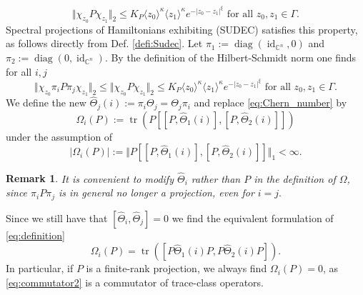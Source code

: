 \documentclass[reqno,12pt,letterpaper]{amsart}
\newcommand{\CC}{{\mathbb C}}
\newtheorem{rem}[theo]{Remark}
\numberwithin{equation}{section}
\DeclareMathOperator{\tr}{tr}
\begin{document}
\begin{appendix}
\begin{equation}
\label{eq:decay} \Vert \chi_{z_0} P \chi_{z_1} \Vert_2 \le K_P \langle z_0 \rangle^{\kappa} \langle z_1 \rangle^{\kappa} e^{-\vert z_0-z_1\vert^{\xi}} \text{ for all }z_0,z_1 \in \Gamma.
\end{equation}
Spectral projections of Hamiltonians exhibiting (SUDEC) satisfies this property, as follows directly from Def. \ref{defi:Sudec}.
Let $\pi_1:=\operatorname{diag}(\operatorname{id}_{\CC^n},0)$ and $\pi_2:=\operatorname{diag}(0,\operatorname{id}_{\CC^n})$. By the definition of the Hilbert-Schmidt norm one finds for all $i,j$
\begin{equation}
\label{eq:HS_Bound} \Vert \chi_{z_0} \pi_i P\pi_j \chi_{z_1} \Vert_2 \le \Vert \chi_{z_0} P \chi_{z_1} \Vert_2  \le K_P \langle z_0 \rangle^{\kappa} \langle z_1 \rangle^{\kappa} e^{-\vert z_0-z_1\vert^{\xi}} \text{ for all }z_0,z_1 \in \Gamma.
\end{equation}
We define the new $\hat \Theta_{j}(i) :=\pi_i \Theta_j = \Theta_j \pi_i$ and replace \eqref{eq:Chern_number} by
\begin{equation}
\label{eq:definition}
 \Omega_i(P):=\tr(P [[P,\hat \Theta_1(i)],[P,\hat \Theta_2(i)]]) 
 \end{equation}
under the assumption of
\begin{equation}
\label{eq:well-posed}
 \vert \Omega_i(P)\vert :=\Vert P [[P,\hat \Theta_1(i)],[P,\hat \Theta_2(i)]]\Vert_1 <\infty.
 \end{equation}
\begin{rem} 
It is convenient to modify $\hat \Theta_i$ rather than $P$ in the definition of $\Omega$, since $\pi_i P \pi_j$ is in general no longer a projection, even for $i=j.$
\end{rem}

Since we still have that $[\hat \Theta_i,\hat \Theta_j ]=0$ we find the equivalent formulation of \eqref{eq:definition}
\begin{equation}
\label{eq:commutator2}
 \Omega_i(P) = \tr( [P\hat \Theta_1(i) P,P\hat \Theta_2(i) P]).
 \end{equation}
In particular, if $P$ is a finite-rank projection, we always find $\Omega_i(P)=0$, as \eqref{eq:commutator2} is a commutator of trace-class operators.


\end{appendix}
\end{document}
